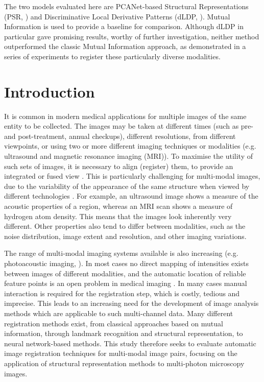 \documentclass{report}
\begin{document}
The two models evaluated here are PCANet-based Structural Representations (PSR, \cite{zhu2018pcanet}) and Discriminative Local Derivative Patterns (dLDP, \cite{jiang2017fast}). Mutual Information is used to provide a baseline for comparison. Although dLDP in particular gave promising results, worthy of further investigation, neither method outperformed the classic Mutual Information approach, as demonstrated in a series of experiments to register these particularly diverse modalities.

\tableofcontents
\chapter{Introduction}

It is common in modern medical applications for multiple images of the same entity to be collected. The images may be taken at different times (such as pre- and post-treatment, annual checkups), different resolutions, from different viewpoints, or using two or more different imaging techniques or modalities (e.g. ultrasound and magnetic resonance imaging (MRI)). To maximise the utility of such sets of images, it is necessary to align (register) them, to provide an integrated or fused view \citep{oliveira2014medical}. This is particularly challenging for multi-modal images, due to the variability of the appearance of the same structure when viewed by different technologies \citep{simonovsky2016deep}. For example, an ultrasound image shows a measure of the acoustic properties of a region, whereas an MRI scan shows a measure of hydrogen atom density. This means that the images look inherently very different.
Other properties also tend to differ between modalities, such as the noise distribution, image extent and resolution, and other imaging variations. 

The range of multi-modal imaging systems available is also increasing (e.g. photoacoustic imaging, \cite{kim2018multimodal}). 
In most cases no direct mapping of intensities exists between images of different modalities, and the automatic location of reliable feature points is an open problem in medical imaging \citep{sotiras2013deformable}. In many cases manual interaction is required for the registration step, which is costly, tedious and imprecise. This leads to an increasing need for the development of image analysis methods which are applicable to such multi-channel data. Many different registration methods exist, from classical approaches based on mutual information, through landmark recognition and structural representation, to neural network-based methods. This study therefore seeks to evaluate automatic image registration techniques for multi-modal image pairs, focusing on the application of structural representation methods to multi-photon microscopy images.
\end{document}
